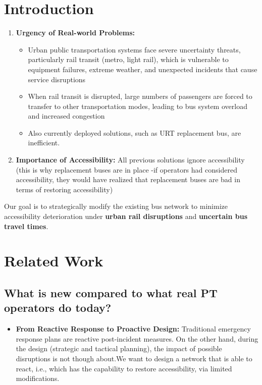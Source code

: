 \documentclass[3p,times,procedia]{elsarticle}
\begin{document}


\vspace*{-12pt}
\section{Introduction}
\begin{enumerate}
    \item \textbf{Urgency of Real-world Problems: }
    \begin{itemize}
        \item Urban public transportation systems face severe uncertainty threats, particularly rail transit (metro, light rail), which is vulnerable to equipment failures, extreme weather, and unexpected incidents that cause service disruptions
        \item When rail transit is disrupted, large numbers of passengers are forced to transfer to other transportation modes, leading to bus system overload and increased congestion
        \item Also currently deployed solutions, such as URT replacement bus, are inefficient.
    \end{itemize}
    \item \textbf{Importance of Accessibility:}
    All previous solutions ignore accessibility (this is why replacement buses are in place -if operators had considered accessibility, they would have realized that replacement buses are bad in terms of restoring accessibility)
\end{enumerate}
Our goal is to strategically modify the existing bus network to minimize accessibility deterioration under \textbf{urban rail disruptions} and \textbf{uncertain bus travel times}. 
\section{Related Work}
\subsection{What is new compared to what real PT operators do today?}
\begin{itemize}
    \item \textbf{From Reactive Response to Proactive Design: }
    Traditional emergency response plans are reactive post-incident measures. On the other hand, during the design (strategic and tactical planning), the impact of possible disruptions is not though about.We want to design a network that is able to react, i.e., which has the capability to restore accessibility, via limited modifications.
\end{itemize}
\end{document}
